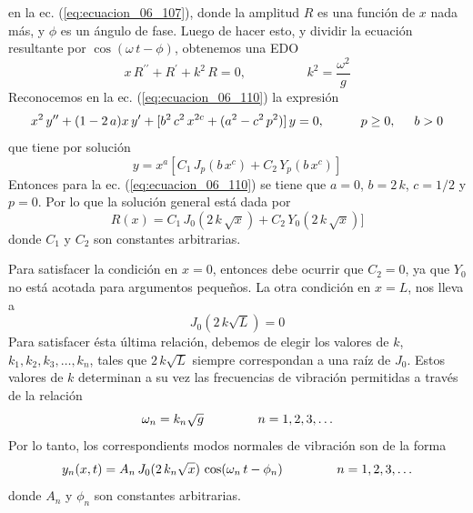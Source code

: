 en la ec. (\ref{eq:ecuacion_06_107}), donde la amplitud $R$ es una función de $x$ nada más, y $\phi$ es un ángulo de fase. Luego de hacer esto, y dividir la ecuación resultante por $\cos (\omega \, t - \phi)$, obtenemos una EDO
\begin{equation}
x \, R^{\prime \prime} + R^{\prime} + k^{2} \, R = 0, \hspace{2cm} k^{2} = \dfrac{\omega^{2}}{g}
\label{eq:ecuacion_06_110}
\end{equation}
Reconocemos en la ec. (\ref{eq:ecuacion_06_110}) la expresión
\begin{equation}
x^{2} \, y^{\prime \prime} + (1 - 2 \, a) x \, y^{\prime} + [b^{2} \, c^{2} \, x^{2c} + (a^{2} - c^{2} \, p^{2}) ] \, y = 0, \hspace{1cm} p \geq 0, \hspace{0.5cm} b > 0
\label{eq:ecuacion_06_098}
\end{equation}
que tiene por solución
\begin{equation}
y = x^{a} [C_{1} \, J_{p} (b \, x^{c}) + C_{2} \, Y_{p} (b \, x^{c})]
\label{eq:ecuacion_06_099}
\end{equation}
Entonces para la ec. (\ref{eq:ecuacion_06_110}) se tiene que $a = 0$, $b = 2 \, k$, $c = 1/2$ y $p=0$. Por lo que la solución general está dada por
\begin{equation}
R(x) = C_{1} \, J_{0} (2 \, k \, \sqrt{x}) + C_{2} \, Y_{0} (2 \, k \, \sqrt{x})]
\label{eq:ecuacion_06_111}
\end{equation}
donde $C_{1}$ y $C_{2}$ son constantes arbitrarias.
\par
Para satisfacer la condición en $x = 0$, entonces debe ocurrir que $C_{2} = 0$, ya que $Y_{0}$ no está acotada para argumentos pequeños. La otra condición en $x = L$, nos lleva a
\begin{equation}
J_{0} (2 \, k \sqrt{L}) = 0
\label{eq:ecuacion_06_112}
\end{equation}
Para satisfacer ésta última relación, debemos de elegir los valores de $k$, $k_{1}, k_{2}, k_{3}, \ldots, k_{n}$, tales que $2 \, k \sqrt{L}$ siempre correspondan a una raíz de $J_{0}$. Estos valores de $k$ determinan a su vez las frecuencias de vibración permitidas a través de la relación
\begin{equation}
\omega_{n} = k_{n} \sqrt{g} \hspace{1.5cm} n = 1, 2, 3, \ldots
\label{eq:ecuacion_06_113}
\end{equation}
Por lo tanto, los correspondients modos normales de vibración son de la forma
\begin{equation}
y_{n} (x, t) = A_{n} \, J_{0} (2 \, k_{n} \sqrt{x}) \, \cos (\omega_{n} \, t - \phi_{n}) \hspace{1.5cm} n = 1, 2, 3, \ldots
\label{eq:ecuacion_06_114}
\end{equation}
donde $A_{n}$ y $\phi_{n}$ son constantes arbitrarias.



